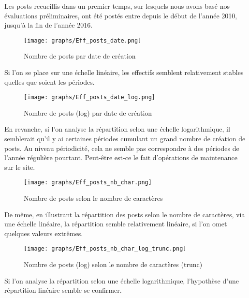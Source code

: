 \documentclass[a4paper, 12pt, openany, oneside, abstract=on]{article} %
\begin{document}
Les posts recueillis dans un premier temps, sur lesquels nous avons basé nos évaluations préliminaires, ont été postés entre depuis le début de l'année 2010, jusqu'à la fin de l'année 2016.

\begin{figure}[H]
    \centering
    \texttt{[image: graphs/Eff\_posts\_date.png]}
    \caption{\label{fig:EffPostsDate}Nombre de posts par date de création}
\end{figure}
Si l'on se place sur une échelle linéaire, les effectifs semblent relativement stables quelles que soient les périodes.

\begin{figure}[H]
    \centering
    \texttt{[image: graphs/Eff\_posts\_date\_log.png]}
    \caption{\label{fig:EffPostsDateLog}Nombre de posts (log) par date de création}
\end{figure}
En revanche, si l'on analyse la répartition selon une échelle logarithmique, il semblerait qu'il y ai certaines périodes cumulant un grand nombre de création de posts. Au niveau périodicité, cela ne semble pas correspondre à des périodes de l'année régulière pourtant. Peut-être est-ce le fait d'opérations de maintenance sur le site.

\begin{figure}[H]
    \centering
    \texttt{[image: graphs/Eff\_posts\_nb\_char.png]}
    \caption{\label{fig:EffPostsNbChar}Nombre de posts selon le nombre de caractères}
\end{figure}
De même, en illustrant la répartition des posts selon le nombre de caractères, via une échelle linéaire, la répartition semble relativement linéaire, si l'on omet quelques valeurs extrêmes.

\begin{figure}[H]
    \centering
    \texttt{[image: graphs/Eff\_posts\_nb\_char\_log\_trunc.png]}
    \caption{\label{fig:EffPostsNbCharLog}Nombre de posts (log) selon le nombre de caractères (trunc)}
\end{figure}
Si l'on analyse la répartition selon une échelle logarithmique, l'hypothèse d'une répartition linéaire semble se confirmer.
\end{document}
